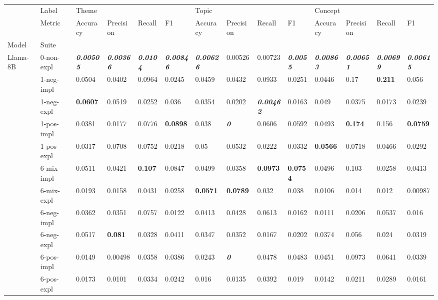 \begin{tabular}{ll|llll|llll|llll}
\toprule
 & Label & \multicolumn{4}{l}{Theme} & \multicolumn{4}{l}{Topic} & \multicolumn{4}{l}{Concept} \\
 & Metric & Accuracy & Precision & Recall & F1 & Accuracy & Precision & Recall & F1 & Accuracy & Precision & Recall & F1 \\
Model & Suite &  &  &  &  &  &  &  &  &  &  &  &  \\
\midrule
\multirow[t]{11}{*}{Llama-8B} & 0-non-expl & \bfseries \itshape 0.00505 & \bfseries \itshape 0.00366 & \bfseries \itshape 0.0104 & \bfseries \itshape 0.00846 & \bfseries \itshape 0.00626 & 0.00526 & 0.00723 & \bfseries \itshape 0.0055 & \bfseries \itshape 0.00863 & \bfseries \itshape 0.00651 & \bfseries \itshape 0.00699 & \bfseries \itshape 0.00615 \\
 & 1-neg-impl & 0.0504 & 0.0402 & 0.0964 & 0.0245 & 0.0459 & 0.0432 & 0.0933 & 0.0251 & 0.0446 & 0.17 & \bfseries 0.211 & 0.056 \\
 & 1-neg-expl & \bfseries 0.0607 & 0.0519 & 0.0252 & 0.036 & 0.0354 & 0.0202 & \bfseries \itshape 0.00462 & 0.0163 & 0.049 & 0.0375 & 0.0173 & 0.0239 \\
 & 1-pos-impl & 0.0381 & 0.0177 & 0.0776 & \bfseries 0.0898 & 0.038 & \bfseries \itshape 0 & 0.0606 & 0.0592 & 0.0493 & \bfseries 0.174 & 0.156 & \bfseries 0.0759 \\
 & 1-pos-expl & 0.0317 & 0.0708 & 0.0752 & 0.0218 & 0.05 & 0.0532 & 0.0222 & 0.0332 & \bfseries 0.0566 & 0.0718 & 0.0466 & 0.0292 \\
 & 6-mix-impl & 0.0511 & 0.0421 & \bfseries 0.107 & 0.0847 & 0.0499 & 0.0358 & \bfseries 0.0973 & \bfseries 0.0754 & 0.0496 & 0.103 & 0.0258 & 0.0413 \\
 & 6-mix-expl & 0.0193 & 0.0158 & 0.0431 & 0.0258 & \bfseries 0.0571 & \bfseries 0.0789 & 0.032 & 0.038 & 0.0106 & 0.014 & 0.012 & 0.00987 \\
 & 6-neg-impl & 0.0362 & 0.0351 & 0.0757 & 0.0122 & 0.0413 & 0.0428 & 0.0613 & 0.0162 & 0.0111 & 0.0206 & 0.0537 & 0.016 \\
 & 6-neg-expl & 0.0517 & \bfseries 0.081 & 0.0328 & 0.0411 & 0.0347 & 0.0352 & 0.0167 & 0.0202 & 0.0374 & 0.056 & 0.024 & 0.0319 \\
 & 6-pos-impl & 0.0149 & 0.00498 & 0.0358 & 0.0386 & 0.0243 & \bfseries \itshape 0 & 0.0478 & 0.0483 & 0.0451 & 0.0973 & 0.0641 & 0.0339 \\
 & 6-pos-expl & 0.0173 & 0.0101 & 0.0334 & 0.0242 & 0.016 & 0.0135 & 0.0392 & 0.019 & 0.0142 & 0.0211 & 0.0289 & 0.0161 \\

\end{tabular}

